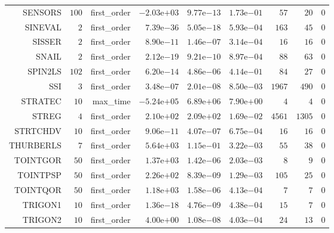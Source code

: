 \begin{longtable}{rrrrrrrrr}
SENSORS & \(   100\) & first\_order & \(-2.03\)e\(+03\) & \( 9.77\)e\(-13\) & \( 1.73\)e\(-01\) & \(    57\) & \(    20\) & \(     0\) \\
SINEVAL & \(     2\) & first\_order & \( 7.39\)e\(-36\) & \( 5.05\)e\(-18\) & \( 5.93\)e\(-04\) & \(   163\) & \(    45\) & \(     0\) \\
SISSER & \(     2\) & first\_order & \( 8.90\)e\(-11\) & \( 1.46\)e\(-07\) & \( 3.14\)e\(-04\) & \(    16\) & \(    16\) & \(     0\) \\
SNAIL & \(     2\) & first\_order & \( 2.12\)e\(-19\) & \( 9.21\)e\(-10\) & \( 8.97\)e\(-04\) & \(    88\) & \(    63\) & \(     0\) \\
SPIN2LS & \(   102\) & first\_order & \( 6.20\)e\(-14\) & \( 4.86\)e\(-06\) & \( 4.14\)e\(-01\) & \(    84\) & \(    27\) & \(     0\) \\
SSI & \(     3\) & first\_order & \( 3.48\)e\(-07\) & \( 2.01\)e\(-08\) & \( 8.50\)e\(-03\) & \(  1967\) & \(   490\) & \(     0\) \\
STRATEC & \(    10\) & max\_time & \(-5.24\)e\(+05\) & \( 6.89\)e\(+06\) & \( 7.90\)e\(+00\) & \(     4\) & \(     4\) & \(     0\) \\
STREG & \(     4\) & first\_order & \( 2.10\)e\(+02\) & \( 2.09\)e\(+02\) & \( 1.69\)e\(-02\) & \(  4561\) & \(  1305\) & \(     0\) \\
STRTCHDV & \(    10\) & first\_order & \( 9.06\)e\(-11\) & \( 4.07\)e\(-07\) & \( 6.75\)e\(-04\) & \(    16\) & \(    16\) & \(     0\) \\
THURBERLS & \(     7\) & first\_order & \( 5.64\)e\(+03\) & \( 1.15\)e\(-01\) & \( 3.22\)e\(-03\) & \(    55\) & \(    38\) & \(     0\) \\
TOINTGOR & \(    50\) & first\_order & \( 1.37\)e\(+03\) & \( 1.42\)e\(-06\) & \( 2.03\)e\(-03\) & \(     8\) & \(     9\) & \(     0\) \\
TOINTPSP & \(    50\) & first\_order & \( 2.26\)e\(+02\) & \( 8.39\)e\(-09\) & \( 1.29\)e\(-03\) & \(   105\) & \(    25\) & \(     0\) \\
TOINTQOR & \(    50\) & first\_order & \( 1.18\)e\(+03\) & \( 1.58\)e\(-06\) & \( 4.13\)e\(-04\) & \(     7\) & \(     7\) & \(     0\) \\
TRIGON1 & \(    10\) & first\_order & \( 1.36\)e\(-18\) & \( 4.76\)e\(-09\) & \( 4.38\)e\(-04\) & \(    15\) & \(     7\) & \(     0\) \\
TRIGON2 & \(    10\) & first\_order & \( 4.00\)e\(+00\) & \( 1.08\)e\(-08\) & \( 4.03\)e\(-04\) & \(    24\) & \(    13\) & \(     0\) \\

\end{longtable}
